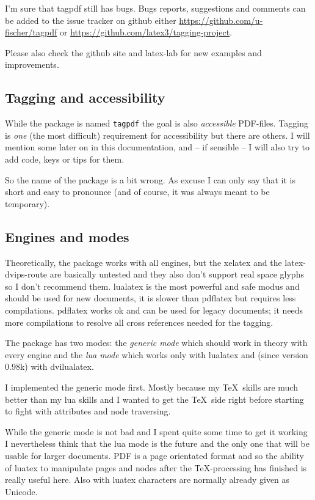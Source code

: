 \documentclass[bibliography=totoc,a4paper]{article}
\newcommand\pkg[1]{\texttt{#1}}
\newcommand\PDF{PDF}
\begin{document}
I'm sure that tagpdf still has bugs. Bugs reports, suggestions and comments 
can be added to the issue tracker on github either 
\url{https://github.com/u-fischer/tagpdf} or
\url{https://github.com/latex3/tagging-project}. 

Please also check the github site and latex-lab for new examples and improvements.

\subsection{Tagging and accessibility}

While the package is named \pkg{tagpdf} the goal is also \emph{accessible} 
\PDF{}-files. Tagging is \emph{one} (the most difficult) requirement for 
accessibility but there are others. I will mention some later on in this 
documentation, and -- if sensible -- I will also try to add code, keys or 
tips for them. 

So the name of the package is a bit wrong. As excuse I can only say that it 
is short and easy to pronounce (and of course, it was always meant to be temporary). 


\subsection{Engines and modes}

 Theoretically, the package works with all engines, but the xelatex and the 
latex-dvips-route are basically untested and they also don't support real 
space glyphs so I don't recommend them. lualatex is the most powerful and 
safe modus and should be used for new documents, it is slower than pdflatex 
but requires less compilations. pdflatex works ok and can be used for legacy 
documents; it needs more compilations to resolve all cross references needed 
for the tagging. 

The package has two modes: the \emph{generic mode} which should work in 
theory with every engine and the \emph{lua mode} which works only with 
lualatex and (since version 0.98k) with dvilualatex. 

I implemented the generic mode first. Mostly because my \TeX\ skills are much 
better than my lua skills and I wanted to get the \TeX\ side right before 
starting to fight with attributes and node traversing. 

While the generic mode is not bad and I spent quite some time to get it 
working I nevertheless think that the lua mode is the future and the only one 
that will be usable for larger documents. \PDF{} is a page orientated format 
and so the ability of luatex to manipulate pages and nodes after the 
\TeX-processing has finished is really useful here. Also with luatex characters are 
normally already given as Unicode. 
\end{document}

